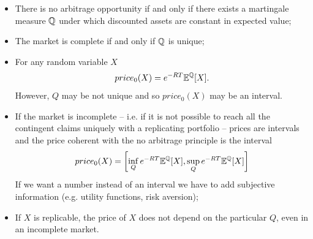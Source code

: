 \begin{itemize}
    \item There is no arbitrage opportunity if and only if there exists a martingale measure ${\mathbb{Q}}$ under which discounted assets are constant in expected value;
    \item The market is complete if and only if ${\mathbb{Q}}$ is unique;
    \item For any random variable $X$
    \begin{equation*}
        price_0(X)=e^{-RT}\mathbb{E}^{\mathbb{Q}}[X].
    \end{equation*}
    However, $Q$ may be not unique and so $price_0(X)$ may be an interval.
    \item If the market is incomplete -- i.e. if it is not possible to reach all the contingent claims uniquely with a replicating portfolio -- prices are intervals and the price coherent with the no arbitrage principle is the interval
    \begin{equation*}
        price_0(X) = \left[\inf_Q e^{-RT}\mathbb{E}^{\mathbb{Q}}[X], \sup_Q e^{-RT}\mathbb{E}^{\mathbb{Q}}[X]\right]
    \end{equation*}
    If we want a number instead of an interval we have to add subjective information (e.g. utility functions, risk aversion);
    \item If $X$ is replicable, the price of $X$ does not depend on the particular $Q$, even in an incomplete market.
\end{itemize}
